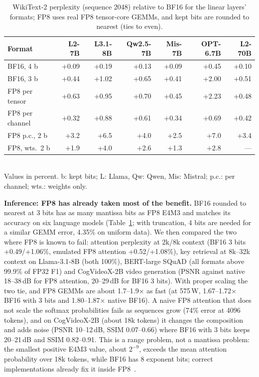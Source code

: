 \documentclass[conference]{IEEEtran}
\newcommand{\W}{\,W}
\newcommand{\pct}{\%}
\begin{document}
\begin{table}[t]
\caption{WikiText-2 perplexity (sequence 2048) relative to BF16 for the linear layers' formats; FP8 uses real FP8
tensor-core GEMMs, and kept bits are rounded to nearest (ties to even).}\label{tab:llm}
\centering\footnotesize\setlength{\tabcolsep}{2.2pt}
\begin{tabular}{@{}lrrrrrr@{}}
\toprule
Format & L2-7B & L3.1-8B & Qw2.5-7B & Mis-7B & OPT-6.7B & L2-70B \\
\midrule
BF16, 4 b & +0.09 & +0.19 & +0.13 & +0.09 & +0.45 & +0.10 \\
BF16, 3 b & +0.44 & +1.02 & +0.65 & +0.41 & +2.00 & +0.51 \\
FP8 per tensor & +0.63 & +0.95 & +0.70 & +0.45 & +2.23 & +0.48 \\
FP8 per channel & +0.32 & +0.88 & +0.61 & +0.34 & +0.69 & +0.42 \\
FP8 p.c., 2 b & +3.2 & +6.5 & +4.0 & +2.5 & +7.0 & +3.4 \\
FP8, wts.\ 2 b & +1.9 & +4.0 & +2.6 & +1.3 & +2.8 & --- \\
\bottomrule
\end{tabular}
\\[2pt]{\scriptsize Values in percent. b: kept bits; L: Llama, Qw: Qwen, Mis: Mistral; p.c.: per channel; wts.: weights only.}
\end{table}

\textbf{Inference: FP8 has already taken most of the benefit.} BF16 rounded to nearest at 3 bits has as many mantissa
bits as FP8 E4M3 and matches its accuracy on six language models (Table~\ref{tab:llm}; with truncation, 4 bits are
needed for a similar GEMM error, 4.35\pct{} on uniform data). We then compared the two where FP8 is known to fail:
attention perplexity at 2k/8k context (BF16 3 bits +0.49/+1.06\pct, emulated FP8 attention +0.52/+1.08\pct), key
retrieval at 8k--32k context on Llama-3.1-8B (both 100\pct), BERT-large SQuAD (all formats above 99.9\pct{} of FP32
F1) and CogVideoX-2B video generation (PSNR against native 18--38\,dB for FP8 attention, 20--29\,dB for BF16 3 bits).
With proper scaling the two tie, and FP8 GEMMs are about 1.7--1.9$\times$ as fast (at 575\W, 1.67--1.72$\times$
BF16 with 3 bits and 1.80--1.87$\times$ native BF16). A naive FP8 attention that does not scale the softmax probabilities fails as sequences grow (74\pct{}
error at 4096 tokens), and on CogVideoX-2B (about 18k tokens) it changes the composition and adds noise (PSNR
10--12\,dB, SSIM 0.07--0.66) where BF16 with 3 bits keeps 20--21\,dB and SSIM 0.82--0.91. This is a range problem,
not a mantissa problem: the smallest positive E4M3 value, about $2^{-9}$, exceeds the mean attention probability over
18k tokens, while BF16 has 8 exponent bits; correct implementations already fix it inside FP8~\cite{Zhang2025}.
\end{document}
